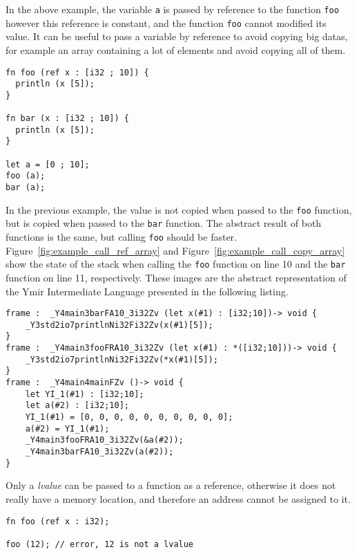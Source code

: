 In the above example, the variable \texttt{a} is passed by reference to the
function \texttt{foo} however this reference is constant, and the function
\texttt{foo} cannot modified its value. It can be useful to pass a variable by
reference to avoid copying big datas, for example an array containing a lot of
elements and avoid copying all of them.

\begin{lstlisting}[style=coloredverbatim, label=lst:result_copy_v_ref_array, caption=Example of passing an array by reference vs. by value]
fn foo (ref x : [i32 ; 10]) {
  println (x [5]);
}

fn bar (x : [i32 ; 10]) {
  println (x [5]);
}

let a = [0 ; 10];
foo (a);
bar (a);
\end{lstlisting}

In the previous example, the value is not copied when passed to the \texttt{foo}
function, but is copied when passed to the \texttt{bar} function. The abstract
result of both functions is the same, but calling \texttt{foo} should be faster.
Figure~\ref{fig:example_call_ref_array} and
Figure~\ref{fig:example_call_copy_array} show the state of the stack when
calling the \texttt{foo} function on line 10 and the \texttt{bar} function on
line 11, respectively. These images are the abstract representation of the Ymir
Intermediate Language presented in the following listing.

\begin{lstlisting}[style=intermediateVerb, caption=YIL result of Listing~\ref{lst:result_copy_v_ref_array}]
frame :  _Y4main3barFA10_3i32Zv (let x(#1) : [i32;10])-> void {
    _Y3std2io7printlnNi32Fi32Zv(x(#1)[5]);
}
frame :  _Y4main3fooFRA10_3i32Zv (let x(#1) : *([i32;10]))-> void {
    _Y3std2io7printlnNi32Fi32Zv(*x(#1)[5]);
}
frame :  _Y4main4mainFZv ()-> void {
    let YI_1(#1) : [i32;10];
    let a(#2) : [i32;10];
    YI_1(#1) = [0, 0, 0, 0, 0, 0, 0, 0, 0, 0];
    a(#2) = YI_1(#1);
    _Y4main3fooFRA10_3i32Zv(&a(#2));
    _Y4main3barFA10_3i32Zv(a(#2));
}
\end{lstlisting}

Only a \textit{lvalue} can be passed to a function as a reference, otherwise it
does not really have a memory location, and therefore an address cannot be
assigned to it.


\begin{lstlisting}[style=coloredverbatim]
fn foo (ref x : i32);

foo (12); // error, 12 is not a lvalue
\end{lstlisting}

